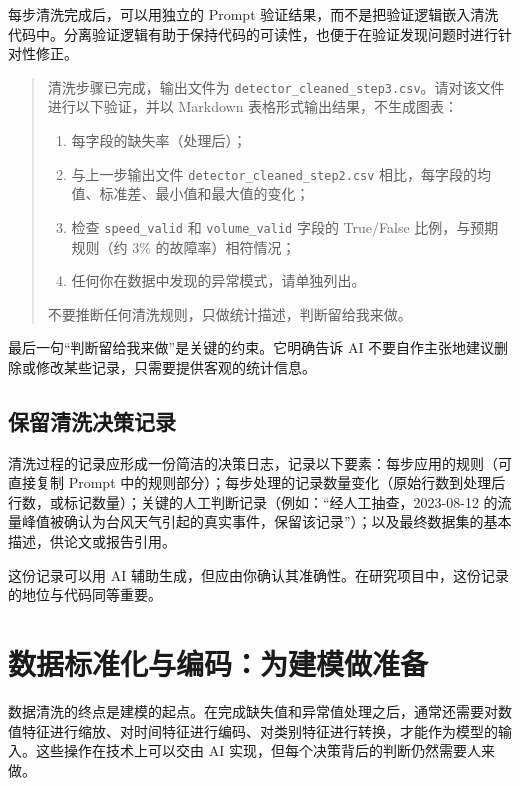 每步清洗完成后，可以用独立的 Prompt 验证结果，而不是把验证逻辑嵌入清洗代码中。分离验证逻辑有助于保持代码的可读性，也便于在验证发现问题时进行针对性修正。

\begin{quote}
清洗步骤已完成，输出文件为 \texttt{detector\_cleaned\_step3.csv}。请对该文件进行以下验证，并以 Markdown 表格形式输出结果，不生成图表：

\begin{enumerate}
  \item 每字段的缺失率（处理后）；
  \item 与上一步输出文件 \texttt{detector\_cleaned\_step2.csv} 相比，每字段的均值、标准差、最小值和最大值的变化；
  \item 检查 \texttt{speed\_valid} 和 \texttt{volume\_valid} 字段的 True/False 比例，与预期规则（约 3\% 的故障率）相符情况；
  \item 任何你在数据中发现的异常模式，请单独列出。
\end{enumerate}

不要推断任何清洗规则，只做统计描述，判断留给我来做。
\end{quote}

最后一句“判断留给我来做”是关键的约束。它明确告诉 AI 不要自作主张地建议删除或修改某些记录，只需要提供客观的统计信息。

\subsection{保留清洗决策记录}

清洗过程的记录应形成一份简洁的决策日志，记录以下要素：每步应用的规则（可直接复制 Prompt 中的规则部分）；每步处理的记录数量变化（原始行数到处理后行数，或标记数量）；关键的人工判断记录（例如：“经人工抽查，2023-08-12 的流量峰值被确认为台风天气引起的真实事件，保留该记录”）；以及最终数据集的基本描述，供论文或报告引用。

这份记录可以用 AI 辅助生成，但应由你确认其准确性。在研究项目中，这份记录的地位与代码同等重要。

\section{数据标准化与编码：为建模做准备}

数据清洗的终点是建模的起点。在完成缺失值和异常值处理之后，通常还需要对数值特征进行缩放、对时间特征进行编码、对类别特征进行转换，才能作为模型的输入。这些操作在技术上可以交由 AI 实现，但每个决策背后的判断仍然需要人来做。

